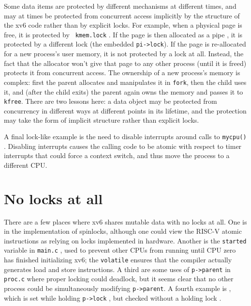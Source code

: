 Some data items are protected by different mechanisms at different
times, and may at times be protected from concurrent access implicitly
by the structure of the xv6 code rather than by explicit locks. For
example, when a physical page is free, it is protected by \texttt{
  kmem.lock} . If the page is then
allocated as a pipe , it is
protected by a different lock (the embedded \texttt{pi->lock}). If the page
is re-allocated for a new process's user memory, it is not protected by a
lock at all. Instead, the fact that the allocator won't give that page
to any other process (until it is freed) protects it from concurrent
access. 
The ownership of a new process's memory is complex:
first the parent allocates and
manipulates it in {\tt fork}, then the child uses it, and (after the
child exits) the parent again owns the memory and passes it to {\tt
  kfree}. There are two lessons here: a data object may be protected
from concurrency in different ways at different points in its
lifetime, and the protection may take the form of implicit structure
rather than explicit locks.

A final lock-like example is the need to disable interrupts around
calls to {\tt mycpu()} . Disabling
interrupts causes the calling code to be atomic with respect to timer
interrupts that could force a context switch, and thus move the
process to a different CPU.

\section{No locks at all}

There are a few places where xv6 shares mutable data with no locks at
all. One is in the implementation of spinlocks, although one could
view the RISC-V atomic instructions as relying on locks implemented in
hardware. Another is the {\tt started} variable in {\tt main.c}
, used to prevent other CPUs from
running until CPU zero has finished initializing xv6;
the {\tt volatile} ensures that the compiler actually generates
load and store instructions.
A third are some uses of {\tt p->parent} in {\tt proc.c}
where proper locking could deadlock, but it seems clear that
no other process could be simultaneously modifying {\tt p->parent}.
A fourth example is , which is set while holding
\texttt{p->lock} ,
but checked without a holding lock .

